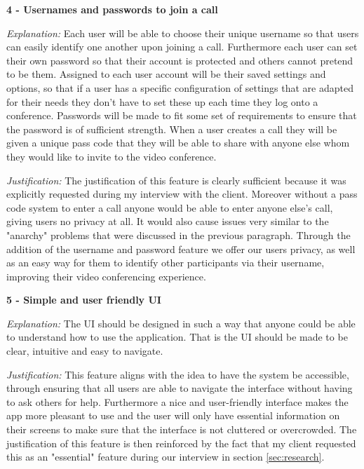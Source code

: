 \vspace{0.2cm}

\textsf{\bfseries 4 - Usernames and passwords to join a call} \\
\vspace{0.1cm}

\textit{Explanation:} Each user will be able to choose their unique username so
that users can easily identify one another upon joining a
call. Furthermore each user can set their own password so
that their account is protected and others cannot pretend to
be them.
Assigned to each user account will be their saved settings and
options, so that if a user has a specific configuration of
settings that are adapted for their needs they don't have to
set these up each time they log onto a conference. Passwords
will be made to fit some set of requirements to ensure that
the password is of sufficient strength. When a user creates a
call they will be given a unique pass code that they will be
able to share with anyone else whom they would like to invite
to the video conference. \vspace{0.1cm}

\textit{Justification:} The justification of this feature is
clearly sufficient because it was explicitly requested during
my interview with the client. Moreover without a pass code
system to enter a call anyone would be able to enter anyone
else's call, giving users no privacy at all. It would also
cause issues very similar to the "anarchy" problems that
were discussed in the previous paragraph. Through the
addition of the username and password feature we offer our
users privacy, as well as an easy way for them to identify
other participants via their username, improving their
video conferencing experience.

\vspace{0.2cm}

\textsf{\bfseries 5 - Simple and user friendly UI} \\ \vspace{0.1cm}

\textit{Explanation:}
The UI should be designed in such a way that anyone could be
able to understand how to use the application. That is the UI
should be made to be clear, intuitive and easy to navigate.
\vspace{0.1cm}

\textit{Justification:}
This feature
aligns with the idea to have the system be accessible,
through ensuring that all users are able to navigate the
interface without having to ask others for help. Furthermore
a nice and user-friendly interface makes the app more
pleasant to use and the user will only have essential
information on their screens
to make sure that the interface is not cluttered or
overcrowded. The justification of this feature is then
reinforced by the fact that my client requested this as an
"essential" feature during our interview
in section \ref{sec:research}. \vspace{0.2cm}

